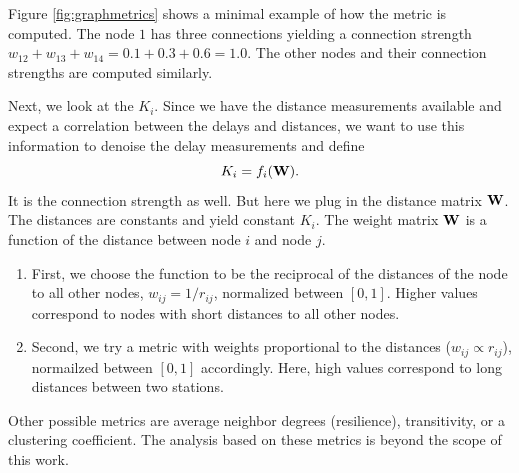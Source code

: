 \documentclass[12pt, sumlimits, intlimits]{article}
\begin{document}
Figure \ref{fig:graphmetrics} shows a minimal example of how the metric is computed. The node $1$ has three connections yielding a connection strength $w_{12} + w_{13} + w_{14} = 0.1+0.3+0.6=1.0$. The other nodes and their connection strengths are computed similarly. 

Next, we look at the $K_i$. Since we have the distance measurements available and expect a correlation between the delays and distances, we want to use this information to denoise the delay measurements and define
\begin{equation}
K_i=f_i(\bf{W}).
\end{equation}
It is the connection strength as well. But here we plug in the distance matrix $\bf{W}$. The distances are constants and yield constant $K_i$.
The weight matrix $\bf{W}$ is a function of the distance between node $i$ and node $j$.
\begin{enumerate}
	\item First, we choose the function to be the reciprocal of the distances of the node to all other nodes, $w_{ij}= 1/r_{ij}$, normalized between $[0,1]$. Higher values correspond to nodes with short distances to all other nodes.
	\item Second, we try a metric with weights proportional to the distances ($w_{ij} \propto r_{ij}$), normailzed between $[0,1]$ accordingly. Here, high values correspond to long distances between two stations.
\end{enumerate}
Other possible metrics are average neighbor degrees (resilience), transitivity, or a clustering coefficient. The analysis based on these metrics is beyond the scope of this work.  
\end{document}
